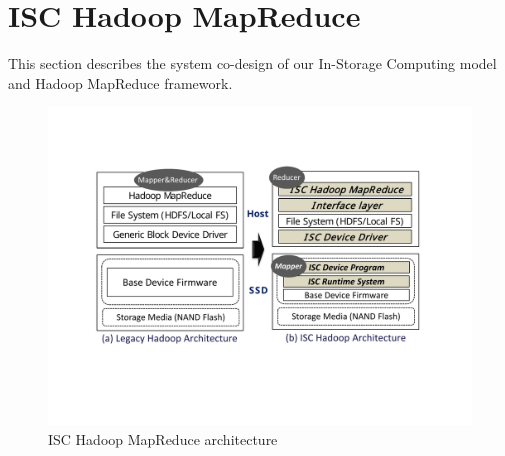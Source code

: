 
\section{ISC Hadoop MapReduce}\label{sec:design}
This section describes the system co-design of our In-Storage Computing model and Hadoop MapReduce framework.






\begin{figure}[htbp]
	\centering
		\includegraphics[width=1.0\columnwidth]{figures/ISC_Hadoop_architecture3.pdf}
	\caption{ISC Hadoop MapReduce architecture}
	\label{fig:ISC_Hadoop_arch}
\end{figure}


